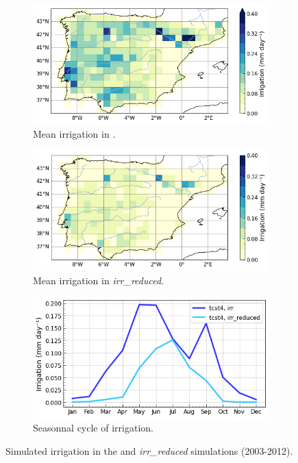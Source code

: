 \begin{figure}[htbp]
    \centering
    \begin{subfigure}[b]{0.32\textwidth}
        \caption{Mean irrigation in \irr.\\ } 
        \includegraphics[width=\textwidth]{images/chap3/maps/irrigation_ave_tcst4_irr.png}
    \end{subfigure}
    \begin{subfigure}[b]{0.32\textwidth}
        \caption{Mean irrigation in \textit{irr\_reduced}.} 
        \includegraphics[width=\textwidth]{images/chap3/maps/irrigation_ave_tcst4_irr_reduced.png}
    \end{subfigure}
    \begin{subfigure}[b]{0.32\textwidth}        
        \caption{Seasonnal cycle of irrigation.} 
        \includegraphics[width=\textwidth]{images/chap3/time_series/irrigation_seasonal_cycle_irr_reduced.png}
    \end{subfigure}
    \caption{Simulated irrigation in the \irr and \textit{irr\_reduced} simulations (2003-2012).}
    \label{fig:merit_irr_reduced}
\end{figure}

